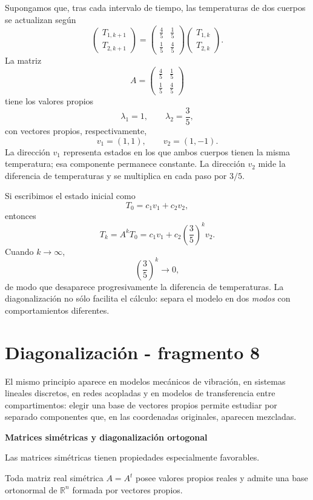 \begin{example}
Supongamos que, tras cada intervalo de tiempo, las temperaturas de dos cuerpos se actualizan según
\[
\begin{pmatrix}
T_{1,k+1}\\
T_{2,k+1}
\end{pmatrix}
=
\begin{pmatrix}
\frac45&\frac15\\[1mm]
\frac15&\frac45
\end{pmatrix}
\begin{pmatrix}
T_{1,k}\\
T_{2,k}
\end{pmatrix}.
\]
La matriz
\[
A=\begin{pmatrix}
\frac45&\frac15\\[1mm]
\frac15&\frac45
\end{pmatrix}
\]
tiene los valores propios
\[
\lambda_1=1,
\qquad
\lambda_2=\frac35,
\]
con vectores propios, respectivamente,
\[
v_1=(1,1),
\qquad
v_2=(1,-1).
\]
La dirección $v_1$ representa estados en los que ambos cuerpos tienen la misma temperatura; esa componente permanece constante. La dirección $v_2$ mide la diferencia de temperaturas y se multiplica en cada paso por $3/5$.

Si escribimos el estado inicial como
\[
T_0=c_1v_1+c_2v_2,
\]
entonces
\[
T_k=A^kT_0=c_1v_1+c_2\left(\frac35\right)^kv_2.
\]
Cuando $k\to\infty$,
\[
\left(\frac35\right)^k\to0,
\]
de modo que desaparece progresivamente la diferencia de temperaturas. La diagonalización no sólo facilita el cálculo: separa el modelo en dos \emph{modos} con comportamientos diferentes.
\end{example}


\section{Diagonalización - fragmento 8}
El mismo principio aparece en modelos mecánicos de vibración, en sistemas lineales discretos, en redes acopladas y en modelos de transferencia entre compartimentos: elegir una base de vectores propios permite estudiar por separado componentes que, en las coordenadas originales, aparecen mezcladas.

\textbf{Matrices simétricas y diagonalización ortogonal}

Las matrices simétricas tienen propiedades especialmente favorables.

\begin{theorem}
Toda matriz real simétrica $A=A^t$ posee valores propios reales y admite una base ortonormal de $\mathbb{R}^n$ formada por vectores propios.
\end{theorem}

